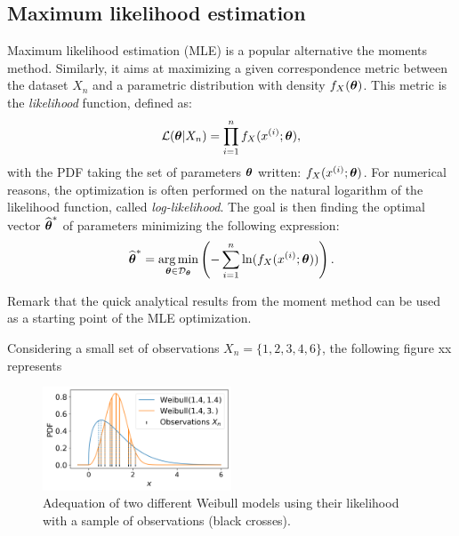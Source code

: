 \subsection*{Maximum likelihood estimation}
Maximum likelihood estimation (MLE) is a popular alternative the moments method. 
Similarly, it aims at maximizing a given correspondence metric between the dataset $X_n$ and a parametric distribution with density $f_X({\boldsymbol{\theta}})$.
This metric is the \textit{likelihood} function, defined as:
\begin{equation}
    \mathcal{L}({\boldsymbol{\theta}}|X_n) = \prod_{i=1}^{n} f_X(x^{(i)}; {\boldsymbol{\theta}}), 
\end{equation}
with the PDF taking the set of parameters ${\boldsymbol{\theta}}$ written: $f_X(x^{(i)}; {\boldsymbol{\theta}})$. For numerical reasons, the optimization is often performed on the natural logarithm of the likelihood function, called \textit{log-likelihood}. 
The goal is then finding the optimal vector $\widehat{{\boldsymbol{\theta}}}^*$ of parameters minimizing the following expression: 
\begin{equation}
    \widehat{{\boldsymbol{\theta}}}^* = \operatorname*{arg\,min}_{{\boldsymbol{\theta}} \in \mathcal{D}_{{\boldsymbol{\theta}}}} \left(-\sum_{i=1}^{n} \mathrm{ln}(f_X(x^{(i)}; {\boldsymbol{\theta}})) \right).
\end{equation}

Remark that the quick analytical results from the moment method can be used as a starting point of the MLE optimization. 

\begin{example}
    \label{ex:mle}
    Considering a small set of observations $X_n = \{1, 2, 3, 4, 6\}$, the following figure xx represents 
    \begin{figure}[H]
        \centering
        \includegraphics[width=0.5\textwidth]{../numerical_experiments/chapter1/figures/MLE.png}
        \caption{Adequation of two different Weibull models using their likelihood with a sample of observations (black crosses). }
        \label{fig:MLE}
    \end{figure}
\end{example}


